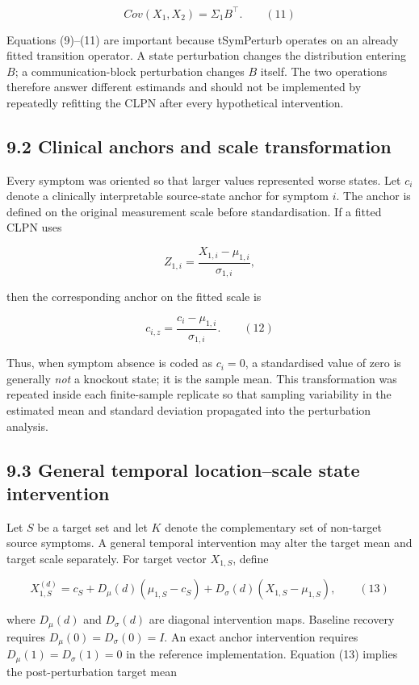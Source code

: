 \documentclass[11pt]{article}
\begin{document}
\[Cov\left( X_{1},X_{2} \right) = \Sigma_{1}B^{\top}.\quad\quad(11)\]

Equations (9)--(11) are important because tSymPerturb operates on an
already fitted transition operator. A state perturbation changes the
distribution entering \(B\); a communication-block perturbation changes
\(B\) itself. The two operations therefore answer different estimands
and should not be implemented by repeatedly refitting the CLPN after
every hypothetical intervention.

\subsection{9.2 Clinical anchors and scale
transformation}\label{clinical-anchors-and-scale-transformation}

Every symptom was oriented so that larger values represented worse
states. Let \(c_{i}\) denote a clinically interpretable source-state
anchor for symptom \(i\). The anchor is defined on the original
measurement scale before standardisation. If a fitted CLPN uses

\[Z_{1,i} = \frac{X_{1,i} - \mu_{1,i}}{\sigma_{1,i}},\]

then the corresponding anchor on the fitted scale is

\[c_{i,z} = \frac{c_{i} - \mu_{1,i}}{\sigma_{1,i}}.\quad\quad(12)\]

Thus, when symptom absence is coded as \(c_{i} = 0\), a standardised
value of zero is generally \emph{not} a knockout state; it is the sample
mean. This transformation was repeated inside each finite-sample
replicate so that sampling variability in the estimated mean and
standard deviation propagated into the perturbation analysis.

\subsection{9.3 General temporal location--scale state
intervention}\label{general-temporal-locationscale-state-intervention}

Let \(S\) be a target set and let \(K\) denote the complementary set of
non-target source symptoms. A general temporal intervention may alter
the target mean and target scale separately. For target vector
\(X_{1,S}\), define

\[X_{1,S}^{(d)} = c_{S} + D_{\mu}(d)\left( \mu_{1,S} - c_{S} \right) + D_{\sigma}(d)\left( X_{1,S} - \mu_{1,S} \right),\quad\quad(13)\]

where \(D_{\mu}(d)\) and \(D_{\sigma}(d)\) are diagonal intervention
maps. Baseline recovery requires \(D_{\mu}(0) = D_{\sigma}(0) = I\). An
exact anchor intervention requires \(D_{\mu}(1) = D_{\sigma}(1) = 0\) in
the reference implementation. Equation (13) implies the
post-perturbation target mean
\end{document}
